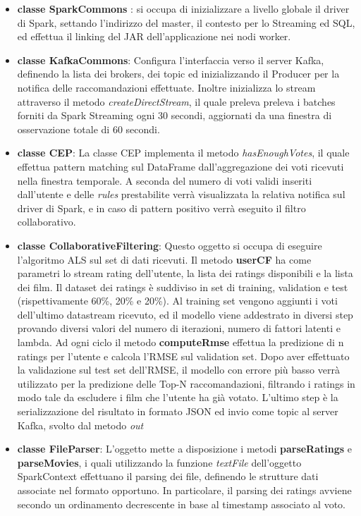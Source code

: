 \documentclass[12pt]{article}
\begin{document}
\begin{itemize}
	\item \textbf{classe SparkCommons} : si occupa di inizializzare a livello globale il driver di Spark, settando l'indirizzo del master, il contesto per lo Streaming ed SQL, ed effettua il linking del JAR dell'applicazione nei nodi worker.
	\item \textbf{classe KafkaCommons}: Configura l'interfaccia verso il server Kafka, definendo la lista dei brokers, dei topic ed inizializzando il Producer per la notifica delle raccomandazioni effettuate. Inoltre inizializza lo stream attraverso il metodo \textit{createDirectStream}, il quale preleva preleva i batches forniti da Spark Streaming ogni 30 secondi, aggiornati da una finestra di osservazione totale di 60 secondi.
	\item \textbf{classe CEP}: La classe CEP implementa il metodo \textit{hasEnoughVotes}, il quale effettua pattern matching sul DataFrame dall'aggregazione dei voti ricevuti nella finestra temporale. A seconda del numero di voti validi inseriti dall'utente e delle \textit{rules} prestabilite verrà visualizzata la relativa notifica sul driver di Spark, e in caso di pattern positivo verrà eseguito il filtro collaborativo.
	\item \textbf{classe CollaborativeFiltering}: Questo oggetto si occupa di eseguire l'algoritmo ALS sul set di dati ricevuti. 
    Il metodo \textbf{userCF} ha come parametri lo stream rating dell'utente, la lista dei ratings disponibili e la lista dei film. Il dataset dei ratings è suddiviso in set di training, validation e test (rispettivamente 60\%, 20\% e 20\%). Al training set vengono aggiunti i voti dell'ultimo datastream ricevuto, ed il modello viene addestrato in diversi step provando diversi valori del numero di iterazioni, numero di fattori latenti e lambda. Ad ogni ciclo il metodo \textbf{computeRmse} effettua la predizione di n ratings per l'utente e calcola l'RMSE sul validation set.
	Dopo aver effettuato la validazione sul test set dell'RMSE, il modello con errore più basso verrà utilizzato per la predizione delle Top-N raccomandazioni, filtrando i ratings in modo tale da escludere i film che l'utente ha già votato. L'ultimo step è la serializzazione del risultato in formato JSON ed invio come topic al server Kafka, svolto dal metodo \textit{out}
	
	\item \textbf{classe FileParser}: L'oggetto mette a disposizione i metodi \textbf{parseRatings} e \textbf{parseMovies}, i quali utilizzando la funzione \textit{textFile} dell'oggetto SparkContext effettuano il parsing dei file, definendo le strutture dati associate nel formato opportuno. In particolare, il parsing dei ratings avviene secondo un ordinamento decrescente in base al timestamp associato al voto. 
	

\end{itemize}
\end{document}
